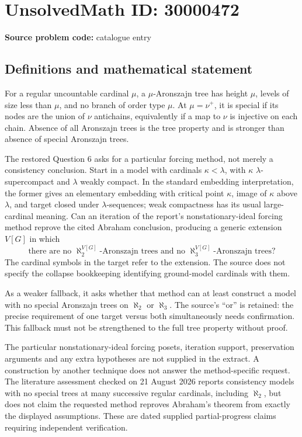 \documentclass[11pt]{article}
\begin{document}
\section*{UnsolvedMath ID: 30000472}
\textbf{Source problem code:} catalogue entry
\subsection{Definitions and mathematical statement}
For a regular uncountable cardinal $\mu$, a $\mu$-Aronszajn tree has height $\mu$, levels of size less than $\mu$, and no branch of order type $\mu$. At $\mu=\nu^+$, it is special if its nodes are the union of $\nu$ antichains, equivalently if a map to $\nu$ is injective on each chain. Absence of all Aronszajn trees is the tree property and is stronger than absence of special Aronszajn trees.

The restored Question 6 asks for a particular forcing method, not merely a consistency conclusion. Start in a model with cardinals $\kappa<\lambda$, with $\kappa$ $\lambda$-supercompact and $\lambda$ weakly compact. In the standard embedding interpretation, the former gives an elementary embedding with critical point $\kappa$, image of $\kappa$ above $\lambda$, and target closed under $\lambda$-sequences; weak compactness has its usual large-cardinal meaning. Can an iteration of the report's nonstationary-ideal forcing method reprove the cited Abraham conclusion, producing a generic extension $V[G]$ in which
\[
 \text{there are no }\aleph_2^{V[G]}\text{-Aronszajn trees and no }
                 \aleph_3^{V[G]}\text{-Aronszajn trees}?
\]
The cardinal symbols in the target refer to the extension. The source does not specify the collapse bookkeeping identifying ground-model cardinals with them.

As a weaker fallback, it asks whether that method can at least construct a model with no special Aronszajn trees on $\aleph_2$ or $\aleph_3$. The source's ``or'' is retained: the precise requirement of one target versus both simultaneously needs confirmation. This fallback must not be strengthened to the full tree property without proof.

The particular nonstationary-ideal forcing posets, iteration support, preservation arguments and any extra hypotheses are not supplied in the extract. A construction by another technique does not answer the method-specific request. The literature assessment checked on 21 August 2026 reports consistency models with no special trees at many successive regular cardinals, including $\aleph_2$, but does not claim the requested method reproves Abraham's theorem from exactly the displayed assumptions. These are dated supplied partial-progress claims requiring independent verification.
\end{document}

